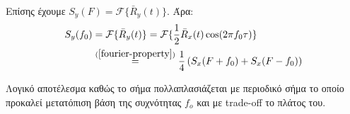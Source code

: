 \documentclass[11pt]{article}
\begin{document}
    \par \noindent
    Επίσης έχουμε $S_y(F) = \mathcal{F}\{\bar{R}_{y}(t)\} $. Άρα:
    \begin{align*}
        S_y(f_0) &= \mathcal{F}\{\bar{R}_{y}(t)\} = \mathcal{F}\{\frac{1}{2}\bar{R}_{x}(t) \cos(2\pi f_0\tau)\} \\
        &\overset{(\ref{fourier-property})}{=} \frac{1}{4} \left( S_x(F+f_0)  + S_x(F-f_0) \right)
    \end{align*}
    
    \par \noindent
    Λογικό αποτέλεσμα καθώς το σήμα πολλαπλασιάζεται με περιοδικό σήμα το οποίο προκαλεί μετατόπιση βάση της συχνότητας $f_o$ και με trade-off το πλάτος του.
%
%
%
\newpage
\end{document}
